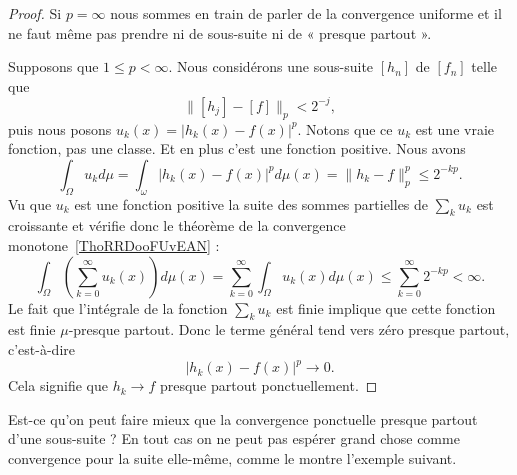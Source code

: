\begin{proof}
    Si \( p=\infty\) nous sommes en train de parler de la convergence uniforme et il ne faut même pas prendre ni de sous-suite ni de « presque partout ».

    Supposons que \( 1\leq p<\infty\). Nous considérons une sous-suite \( [h_n]\) de \( [f_n]\) telle que
    \begin{equation}
        \| [h_j]-[f] \|_p<2^{-j},
    \end{equation}
    puis nous posons \( u_k(x)=| h_k(x)-f(x) |^p\). Notons que ce \( u_k\) est une vraie fonction, pas une classe. Et en plus c'est une fonction positive. Nous avons
    \begin{equation}
        \int_{\Omega}u_kd\mu=\int_{\omega}| h_k(x)-f(x) |^pd\mu(x)=\| h_k-f \|_p^p\leq 2^{-kp}.
    \end{equation}
    Vu que \( u_k\) est une fonction positive la suite des sommes partielles de \( \sum_ku_k\) est croissante et vérifie donc le théorème de la convergence monotone~\ref{ThoRRDooFUvEAN} :
    \begin{equation}
            \int_{\Omega}\left( \sum_{k=0}^{\infty}u_k(x) \right)d\mu(x)=\sum_{k=0}^{\infty}\int_{\Omega}u_k(x)d\mu(x)
            \leq\sum_{k=0}^{\infty}2^{-kp}<\infty.
    \end{equation}
    Le fait que l'intégrale de la fonction \( \sum_ku_k\) est finie implique que cette fonction est finie \( \mu\)-presque partout. Donc le terme général tend vers zéro presque partout, c'est-à-dire
    \begin{equation}
        | h_k(x)-f(x) |^p\to 0.
    \end{equation}
    Cela signifie que \( h_k\to f\) presque partout ponctuellement.
\end{proof}

Est-ce qu'on peut faire mieux que la convergence ponctuelle presque partout d'une sous-suite ? En tout cas on ne peut pas espérer grand chose comme convergence pour la suite elle-même, comme le montre l'exemple suivant.

